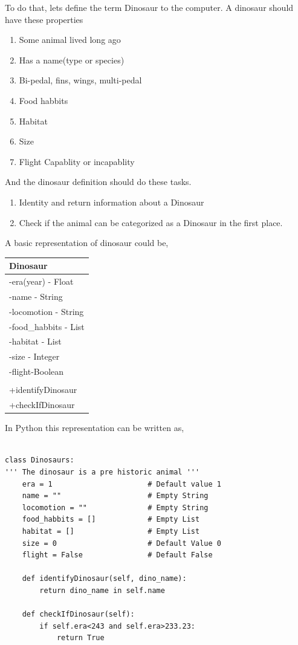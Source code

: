 \documentclass[11pt]{article}
\begin{document}
To do that, lets define the term Dinosaur to the computer. A dinosaur should have these properties

\begin{enumerate}
\item Some animal lived long ago
\item Has a name(type or species)
\item Bi-pedal, fins, wings, multi-pedal
\item Food habbits
\item Habitat
\item Size
\item Flight Capablity or incapablity
\end{enumerate}


And the dinosaur definition should do these tasks.

\begin{enumerate}
\item Identity and return information about a Dinosaur
\item Check if the animal can be categorized as a Dinosaur in the first place.
\end{enumerate}



A basic representation of dinosaur could be,

\begin{center}
\begin{tabular}{|l|}
\hline
Dinosaur \\
\hline
-era(year) - Float \\
-name - String \\
-locomotion - String \\
-food\_habbits - List \\
-habitat - List \\
-size - Integer \\
-flight-Boolean \\
 \\
\hline
+identifyDinosaur \\
+checkIfDinosaur \\
\hline
\end{tabular}
\end{center}


In Python this representation can be written as,


\begin{verbatim}

class Dinosaurs:
''' The dinosaur is a pre historic animal '''
    era = 1                      # Default value 1
    name = ""                    # Empty String
    locomotion = ""              # Empty String
    food_habbits = []            # Empty List
    habitat = []                 # Empty List
    size = 0                     # Default Value 0
    flight = False               # Default False

    def identifyDinosaur(self, dino_name):
        return dino_name in self.name

    def checkIfDinosaur(self):
        if self.era<243 and self.era>233.23:
            return True
\end{verbatim}
\end{document}

